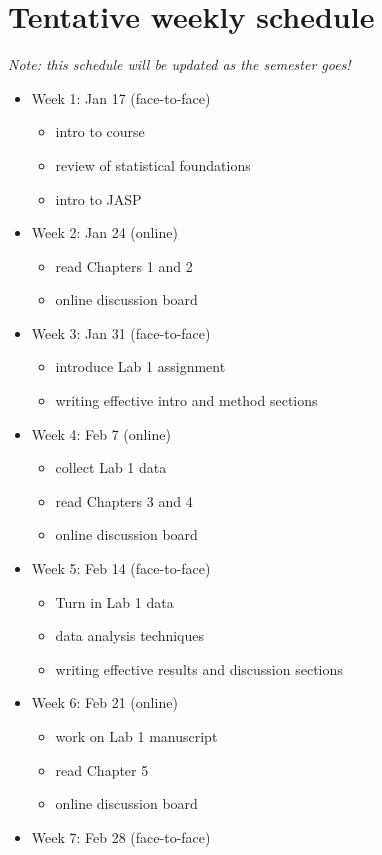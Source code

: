 \documentclass[10pt]{article}
\begin{document}
\section*{Tentative weekly schedule}
\label{sec-11}
\emph{Note: this schedule will be updated as the semester goes!}
\begin{itemize}
\item Week 1: Jan 17 (face-to-face)
\begin{itemize}
\item intro to course
\item review of statistical foundations
\item intro to JASP
\end{itemize}
\item Week 2: Jan 24 (online)
\begin{itemize}
\item read Chapters 1 and 2
\item online discussion board
\end{itemize}
\item Week 3: Jan 31 (face-to-face)
\begin{itemize}
\item introduce Lab 1 assignment
\item writing effective intro and method sections
\end{itemize}
\item Week 4: Feb 7 (online)
\begin{itemize}
\item collect Lab 1 data
\item read Chapters 3 and 4
\item online discussion board
\end{itemize}
\item Week 5: Feb 14 (face-to-face)
\begin{itemize}
\item Turn in Lab 1 data
\item data analysis techniques
\item writing effective results and discussion sections
\end{itemize}
\item Week 6: Feb 21 (online)
\begin{itemize}
\item work on Lab 1 manuscript
\item read Chapter 5
\item online discussion board
\end{itemize}
\item Week 7: Feb 28 (face-to-face)

\end{itemize}
\end{document}
